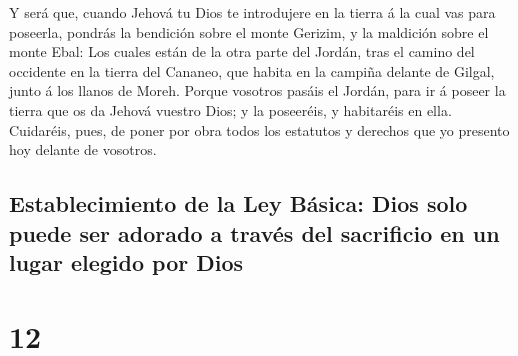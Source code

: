  Y será que, cuando Jehová tu Dios te introdujere en la
tierra á la cual vas para poseerla, pondrás la bendición sobre el monte
Gerizim, y la maldición sobre el monte Ebal:  Los cuales
están de la otra parte del Jordán, tras el camino del occidente en la
tierra del Cananeo, que habita en la campiña delante de Gilgal, junto á
los llanos de Moreh.  Porque vosotros pasáis el Jordán,
para ir á poseer la tierra que os da Jehová vuestro Dios; y la
poseeréis, y habitaréis en ella.  Cuidaréis, pues, de
poner por obra todos los estatutos y derechos que yo presento hoy
delante de vosotros.

\hypertarget{establecimiento-de-la-ley-buxe1sica-dios-solo-puede-ser-adorado-a-travuxe9s-del-sacrificio-en-un-lugar-elegido-por-dios}{%
\subsection{Establecimiento de la Ley Básica: Dios solo puede ser
adorado a través del sacrificio en un lugar elegido por
Dios}\label{establecimiento-de-la-ley-buxe1sica-dios-solo-puede-ser-adorado-a-travuxe9s-del-sacrificio-en-un-lugar-elegido-por-dios}}

\hypertarget{section-05-12}{%
\section{12}\label{section-05-12}}

